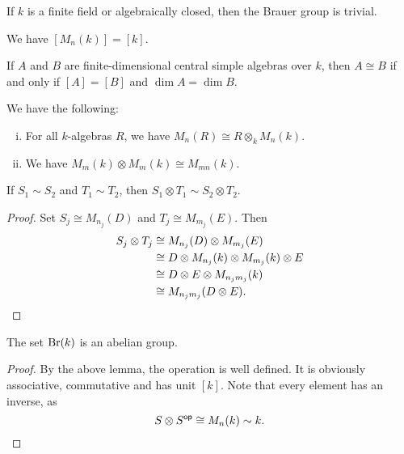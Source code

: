 \begin{opomba}
If $k$ is a finite field or algebraically closed, then the Brauer
group is trivial.
\end{opomba}

\begin{opomba}
We have $[M_n(k)] = [k]$.
\end{opomba}

\begin{opomba}
If $A$ and $B$ are finite-dimensional central simple algebras over
$k$, then $A \cong B$ if and only if $[A] = [B]$ and
$\dim A = \dim B$.
\end{opomba}

\begin{lema}
We have the following:

\begin{enumerate}[i)]
\item For all $k$-algebras $R$, we have
$M_n(R) \cong R \otimes_k M_n(k)$.
\item We have $M_m(k) \otimes M_m(k) \cong M_{mn}(k)$.
\end{enumerate}
\end{lema}

\begin{lema}
If $S_1 \sim S_2$ and $T_1 \sim T_2$, then
$S_1 \otimes T_1 \sim S_2 \otimes T_2$.
\end{lema}

\begin{proof}
Set $S_j \cong M_{n_j}(D)$ and $T_j \cong M_{m_j}(E)$. Then
\begin{align*}
S_j \otimes T_j &\cong
M_{n_j}(D) \otimes M_{m_j}(E)
\\
&\cong
D \otimes M_{n_j}(k) \otimes M_{m_j}(k) \otimes E
\\
&\cong
D \otimes E \otimes M_{n_j m_j}(k)
\\
&\cong
M_{n_j m_j}(D \otimes E). \qedhere
\end{align*}
\end{proof}

\begin{izrek}
The set $\operatorname{Br}(k)$ is an abelian group.
\end{izrek}

\begin{proof}
By the above lemma, the operation is well defined. It is obviously
associative, commutative and has unit $[k]$. Note that every
element has an inverse, as
\[
S \otimes S^{\mathsf{op}} \cong M_n(k) \sim k. \qedhere
\]
\end{proof}

